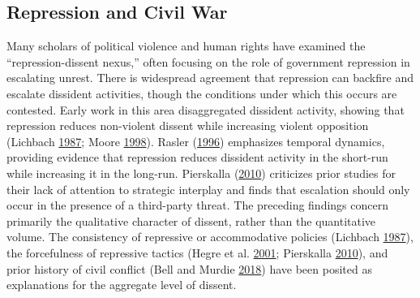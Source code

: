 \documentclass[12pt,]{article}
\theoremstyle{definition}
\theoremstyle{definition}
\theoremstyle{definition}
\theoremstyle{remark}
\begin{document}
\hypertarget{repression-and-civil-war}{%
\subsection{Repression and Civil War}\label{repression-and-civil-war}}

Many scholars of political violence and human rights have examined the
``repression-dissent nexus,'' often focusing on the role of government
repression in escalating unrest. There is widespread agreement that
repression can backfire and escalate dissident activities, though the
conditions under which this occurs are contested. Early work in this
area disaggregated dissident activity, showing that repression reduces
non-violent dissent while increasing violent opposition (Lichbach
\protect\hyperlink{ref-Lichbach1987}{1987}; Moore
\protect\hyperlink{ref-Moore1998}{1998}). Rasler
(\protect\hyperlink{ref-Rasler1996}{1996}) emphasizes temporal dynamics,
providing evidence that repression reduces dissident activity in the
short-run while increasing it in the long-run. Pierskalla
(\protect\hyperlink{ref-Pierskalla2010}{2010}) criticizes prior studies
for their lack of attention to strategic interplay and finds that
escalation should only occur in the presence of a third-party threat.
The preceding findings concern primarily the qualitative character of
dissent, rather than the quantitative volume. The consistency of
repressive or accommodative policies (Lichbach
\protect\hyperlink{ref-Lichbach1987}{1987}), the forcefulness of
repressive tactics (Hegre et al.
\protect\hyperlink{ref-Hegre2001}{2001}; Pierskalla
\protect\hyperlink{ref-Pierskalla2010}{2010}), and prior history of
civil conflict (Bell and Murdie \protect\hyperlink{ref-Bell2018}{2018})
have been posited as explanations for the aggregate level of dissent.
\end{document}
